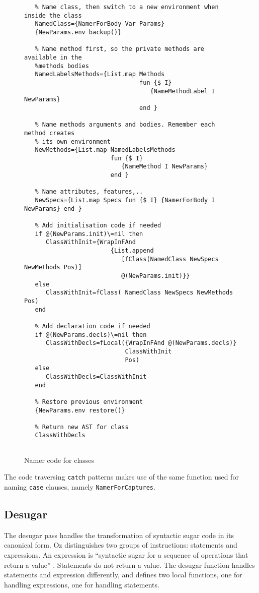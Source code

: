 \documentclass[a4paper]{memoir}
\begin{document}
\begin{figure}[H]
\begin{lstlisting}
   % Name class, then switch to a new environment when inside the class
   NamedClass={NamerForBody Var Params}
   {NewParams.env backup()}

   % Name method first, so the private methods are available in the 
   %methods bodies
   NamedLabelsMethods={List.map Methods 
                                fun {$ I} 
                                   {NameMethodLabel I NewParams} 
                                end }

   % Name methods arguments and bodies. Remember each method creates
   % its own environment
   NewMethods={List.map NamedLabelsMethods 
                        fun {$ I} 
                           {NameMethod I NewParams} 
                        end }

   % Name attributes, features,..
   NewSpecs={List.map Specs fun {$ I} {NamerForBody I NewParams} end }

   % Add initialisation code if needed
   if @(NewParams.init)\=nil then
      ClassWithInit={WrapInFAnd 
                        {List.append 
                           [fClass(NamedClass NewSpecs NewMethods Pos)] 
                           @(NewParams.init)}}
   else
      ClassWithInit=fClass( NamedClass NewSpecs NewMethods Pos)
   end

   % Add declaration code if needed
   if @(NewParams.decls)\=nil then
      ClassWithDecls=fLocal({WrapInFAnd @(NewParams.decls)} 
                            ClassWithInit 
                            Pos)
   else
      ClassWithDecls=ClassWithInit
   end

   % Restore previous environment
   {NewParams.env restore()}

   % Return new AST for class
   ClassWithDecls
  
\end{lstlisting}
\caption{Namer code for classes}
\label{fig:namer:classesexample}
\end{figure}


The code traversing \lstinline!catch! patterns makes use of the same
function used for naming \lstinline!case! clauses, namely
\lstinline!NamerForCaptures!.



\subsection{Desugar}\label{sec:arch:desugar}
The desugar pass handles the transformation of syntactic sugar code in its canonical form.
Oz distinguishes two groups of instructions: statements and expressions. An expression is ``syntactic sugar for a sequence of operations that return a value'' . Statements do not return a value.
The desugar function handles statements and expression differently, and defines two local functions, one for handling expressions, one for handling statements.
\end{document}
